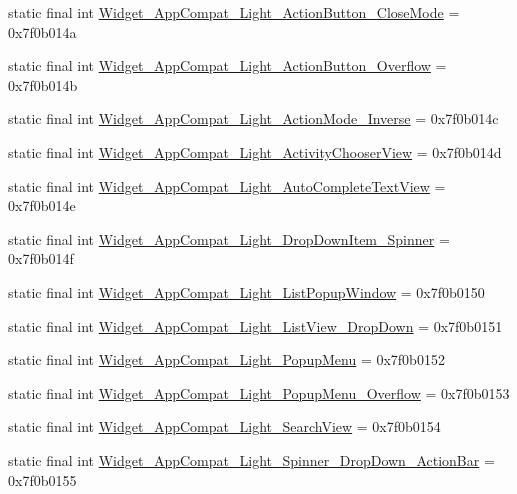 \begin{CompactItemize}
\item 
static final int \hyperlink{classandroid_1_1support_1_1coreutils_1_1_r_1_1style_64a1d784bfecaaf16d02ac797d32a632}{Widget\_\-AppCompat\_\-Light\_\-ActionButton\_\-CloseMode} = 0x7f0b014a
\item 
static final int \hyperlink{classandroid_1_1support_1_1coreutils_1_1_r_1_1style_0785ac0a367aac425959ad019c3bc0e0}{Widget\_\-AppCompat\_\-Light\_\-ActionButton\_\-Overflow} = 0x7f0b014b
\item 
static final int \hyperlink{classandroid_1_1support_1_1coreutils_1_1_r_1_1style_9ef65a2396d050ccac4232959074c14c}{Widget\_\-AppCompat\_\-Light\_\-ActionMode\_\-Inverse} = 0x7f0b014c
\item 
static final int \hyperlink{classandroid_1_1support_1_1coreutils_1_1_r_1_1style_57caa6fc125b530ef57826237ac75116}{Widget\_\-AppCompat\_\-Light\_\-ActivityChooserView} = 0x7f0b014d
\item 
static final int \hyperlink{classandroid_1_1support_1_1coreutils_1_1_r_1_1style_a487fd382cd8c5d593f596f379a3a1f1}{Widget\_\-AppCompat\_\-Light\_\-AutoCompleteTextView} = 0x7f0b014e
\item 
static final int \hyperlink{classandroid_1_1support_1_1coreutils_1_1_r_1_1style_edcd00682edfd4d7e089ac2babb9d524}{Widget\_\-AppCompat\_\-Light\_\-DropDownItem\_\-Spinner} = 0x7f0b014f
\item 
static final int \hyperlink{classandroid_1_1support_1_1coreutils_1_1_r_1_1style_9a6008460ac2ce76ce6e96412ead40da}{Widget\_\-AppCompat\_\-Light\_\-ListPopupWindow} = 0x7f0b0150
\item 
static final int \hyperlink{classandroid_1_1support_1_1coreutils_1_1_r_1_1style_2672a206c07afe84cf094faf05ab6f81}{Widget\_\-AppCompat\_\-Light\_\-ListView\_\-DropDown} = 0x7f0b0151
\item 
static final int \hyperlink{classandroid_1_1support_1_1coreutils_1_1_r_1_1style_fe2dd047f709bfd424f7a6827ed59bbe}{Widget\_\-AppCompat\_\-Light\_\-PopupMenu} = 0x7f0b0152
\item 
static final int \hyperlink{classandroid_1_1support_1_1coreutils_1_1_r_1_1style_bb59512e1d134f2c81c9b0c425466528}{Widget\_\-AppCompat\_\-Light\_\-PopupMenu\_\-Overflow} = 0x7f0b0153
\item 
static final int \hyperlink{classandroid_1_1support_1_1coreutils_1_1_r_1_1style_645f4f887a7d5c5101abd6a662a9d00f}{Widget\_\-AppCompat\_\-Light\_\-SearchView} = 0x7f0b0154
\item 
static final int \hyperlink{classandroid_1_1support_1_1coreutils_1_1_r_1_1style_41d5238d6810419b39e6ce0c642cc1d0}{Widget\_\-AppCompat\_\-Light\_\-Spinner\_\-DropDown\_\-ActionBar} = 0x7f0b0155

\end{CompactItemize}
